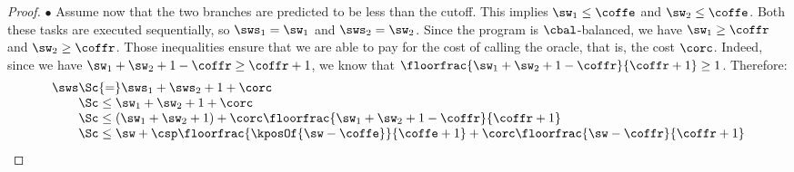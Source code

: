 \begin{proof}
$\bullet$  Assume now that the two branches are predicted to be less than the cutoff.
This implies $\sw_1 \leq \coffe$ and $\sw_2 \leq \coffe$. Both these tasks
are executed sequentially, so $\sws_1 = \sw_1$ and $\sws_2 = \sw_2$. %
Since the program is $\cbal$-balanced, 
%
%
we have $\sw_1 \geq \coffr$
and $\sw_2 \geq \coffr$. 
Those inequalities ensure that we are able to pay for the cost of calling the oracle,
that is, the cost $\corc$.
Indeed, since we have $\sw_1 + \sw_2 + 1 - \coffr \geq \coffr+1$, 
we know that $\floorfrac{\sw_1 + \sw_2 + 1-\coffr}{\coffr+1} \geq 1$.
Therefore:
%
$$\begin{array}{l@{}ll}
\sws 
& \Sc{=} \sws_1 + \sws_2 + 1 + \corc \\ 
& \Sc\leq \sw_1 + \sw_2 + 1 + \corc \\
& \Sc\leq (\sw_1 + \sw_2 + 1) + \corc \floorfrac{\sw_1 + \sw_2 + 1-\coffr}{\coffr+1}  \\
& \Sc\leq \sw + \csp \floorfrac{\kposOf{\sw-\coffe}}{\coffe+1} + \corc \floorfrac{\sw-\coffr}{\coffr+1} \\
\end{array}$$


\end{proof}
